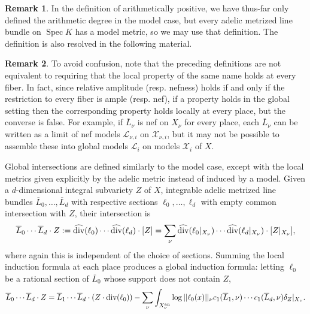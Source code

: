 \documentclass[times, doublespace]{amsart}
\numberwithin{equation}{section}
\theoremstyle{plain}
\theoremstyle{definition}
\newtheorem*{remark}{Remark}
\DeclareMathOperator{\Spec}{Spec}
\DeclareMathOperator{\an}{an}
\renewcommand{\div}{\text{div}}
\newcommand{\cX}{\mathcal{X}}
\newcommand{\calL}{\mathcal{L}}
\begin{document}
\begin{remark}
In the definition of arithmetically positive, we have thus-far only defined the arithmetic degree in the model case, but every adelic metrized line bundle on $\Spec K$ has a model metric, so we may use that definition. The definition is also resolved in the following material.
\end{remark}


\begin{remark}
To avoid confusion, note that the preceding definitions are not equivalent to requiring that the local property of the same name holds at every fiber. In fact, since relative amplitude (resp. nefness) holds if and only if the restriction to every fiber is ample (resp. nef), if a property holds in the global setting then the corresponding property holds locally at every place, but the converse is false. For example, if $\overline L_{\nu}$ is nef on $X_{\nu}$ for every place, each $\overline L_{\nu}$ can be written as a limit of nef models $\calL_{\nu,i}$ on $\cX_{\nu,i}$, but it may not be possible to assemble these into global models $\calL_i$ on models $\cX_i$ of $X$.
\end{remark}


Global intersections are defined similarly to the model case, except with the local metrics given explicitly by the adelic metric instead of induced by a model. Given a $d$-dimensional integral subvariety $Z$ of $X$, integrable adelic metrized line bundles $\overline L_0,\dots,\overline L_d$ with respective sections $\ell_0,\dots,\ell_d$ with empty common intersection with $Z$, their intersection is 
\begin{equation*}\overline L_0\cdots\overline L_d\cdot Z:=\widehat{\div}(\ell_0)\cdots\widehat{\div}(\ell_d)\cdot[Z]\\=\sum_{\nu}\widehat{\div}(\ell_0|_{X_{\nu}})\cdots\widehat{\div}(\ell_d|_{X_{\nu}})\cdot[Z|_{X_{\nu}}],
\end{equation*}
where again this is independent of the choice of sections. Summing the local induction formula at each place produces a global induction formula: letting $\ell_0$ be a rational section of $\overline L_0$ whose support does not contain $Z$, 
\begin{equation*}\overline L_0\cdots\overline L_d\cdot Z=\overline L_1\cdots\overline L_d\cdot (Z\cdot\div(\ell_0))\\-\sum_{\nu}\int_{X_{\nu}^{\an}}\log ||\ell_0(x)||_{\nu}c_1(\overline L_1,\nu)\cdots c_1(\overline L_d,\nu)\delta_Z|_{X_{\nu}}.
\end{equation*}
\end{document}
